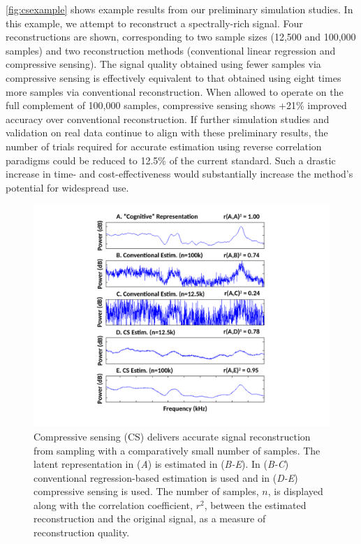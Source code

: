 \documentclass[11pt, notitlepage]{article} %
\begin{document}
\autoref{fig:csexample} shows example results from our preliminary simulation studies.
In this example, we attempt to reconstruct a spectrally-rich signal.
Four reconstructions are shown, corresponding to two sample sizes (12,500 and 100,000 samples)
and two reconstruction methods (conventional linear regression and compressive sensing).
The signal quality obtained using fewer samples via compressive sensing
is effectively equivalent to that obtained using eight times more samples
via conventional reconstruction.
When allowed to operate on the full complement of 100,000 samples,
compressive sensing shows +21\% improved accuracy over conventional reconstruction.
If further simulation studies and validation on real data continue to align with these preliminary results,
the number of trials required for accurate estimation using reverse correlation paradigms
could be reduced to 12.5\% of the current standard.
Such a drastic increase in time- and cost-effectiveness would substantially
increase the method's potential for widespread use.

\begin{figure}[h] %
	\centering
	\includegraphics[width=\textwidth]{Figures/CompSensExamples.pdf}
	\caption{Compressive sensing (CS) delivers accurate signal reconstruction from sampling
	with a comparatively small number of samples.
	The latent representation in (\emph{A}) is estimated in (\emph{B-E}).
	In (\emph{B-C}) conventional regression-based estimation is used
	and in (\emph{D-E}) compressive sensing is used.
	The number of samples, $n$, is displayed along with the correlation coefficient, $r^2$,
	between the estimated reconstruction and the original signal,
	as a measure of reconstruction quality.}
	\label{fig:csexample}
\end{figure}
\end{document}
